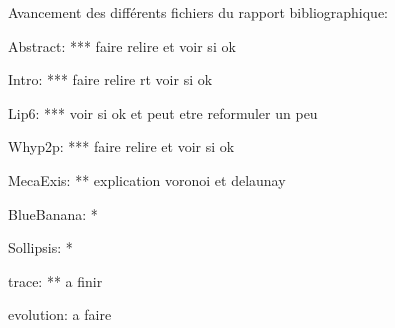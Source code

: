 Avancement des différents fichiers du rapport bibliographique:

Abstract: *** faire relire et voir si ok 

Intro: *** faire relire rt voir si ok

Lip6: *** voir si ok et peut etre reformuler un peu
 
Whyp2p: *** faire relire et voir si ok

MecaExis: ** explication voronoi et delaunay

BlueBanana: *

Sollipsis: *

trace: ** a finir

evolution: a faire
